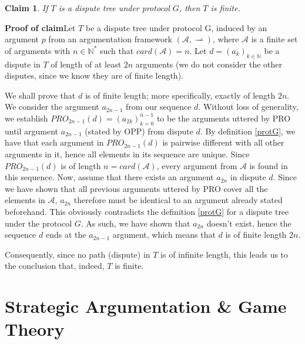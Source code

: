 \documentclass[12pt, a4paper]{article}
\newcommand{\df}{\ensuremath{\rightharpoonup}}
\newtheorem{Claim}{Claim}
\begin{document}
\begin{Claim}
	If $T$ is a dispute tree under protocol $G$, then $T$ is finite.
\end{Claim}


\noindent\textbf{Proof of claim}\quad Let $T$ be a dispute tree under protocol G, induced by an argument $p$ from an argumentation framework $(\mathcal{A}, \df)$, where $\mathcal{A}$ is a finite set of arguments with $n \in \mathbb{N^*}$ such that $card(\mathcal{A}) = n$. Let $d = (a_{k})_{k \in \mathbb{N}}$ be a dispute in $T$ of length of at least $2n$ arguments (we do not consider the other disputes, since we know they are of finite length).

We shall prove that $d$ is of finite length; more specifically, exactly of length $2n$. We consider the argument $a_{2n - 1}$ from our sequence $d$. Without loss of generality, we establish $PRO_{2n-1}(d) = (a_{2k})_{k=0}^{n-1}$ to be the arguments uttered by PRO until argument $a_{2n - 1}$ (stated by OPP) from dispute $d$. By definition \ref{protG}, we have that each argument in $PRO_{2n-1}(d)$ is pairwise different with all other arguments in it, hence all elements in its sequence are unique. Since $PRO_{2n-1}(d)$ is of length $n = card(\mathcal{A})$, every argument from $\mathcal{A}$ is found in this sequence. Now, assume that there exists an argument $a_{2n}$ in dispute $d$. Since we have shown that all previous arguments uttered by PRO cover all the elements in $\mathcal{A}$, $a_{2n}$ therefore must be identical to an argument already stated beforehand. This obviously contradicts the definition \ref{protG} for a dispute tree under the protocol $G$. As such, we have shown that $a_{2n}$ doesn't exist, hence the sequence $d$ ends at the $a_{2n-1}$ argument, which means that $d$ is of finite length $2n$.

Consequently, since no path (dispute) in $T$ is of infinite length, this leads us to the conclusion that, indeed, $T$ is finite.



\newpage

\section{Strategic Argumentation \& Game Theory}
\end{document}
